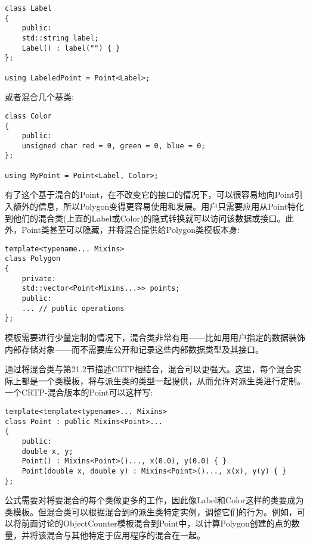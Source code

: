 \begin{lstlisting}[style=styleCXX]
class Label
{
	public:
	std::string label;
	Label() : label("") { }
};

using LabeledPoint = Point<Label>;
\end{lstlisting}

或者混合几个基类:

\begin{lstlisting}[style=styleCXX]
class Color
{
	public:
	unsigned char red = 0, green = 0, blue = 0;
};

using MyPoint = Point<Label, Color>;
\end{lstlisting}

有了这个基于混合的Point，在不改变它的接口的情况下，可以很容易地向Point引入额外的信息，所以Polygon变得更容易使用和发展。用户只需要应用从Point特化到他们的混合类(上面的Label或Color)的隐式转换就可以访问该数据或接口。此外，Point类甚至可以隐藏，并将混合提供给Polygon类模板本身:

\begin{lstlisting}[style=styleCXX]
template<typename... Mixins>
class Polygon
{
	private:
	std::vector<Point<Mixins...>> points;
	public:
	... // public operations
};
\end{lstlisting}

模板需要进行少量定制的情况下，混合类非常有用——比如用用户指定的数据装饰内部存储对象——而不需要库公开和记录这些内部数据类型及其接口。


通过将混合类与第21.2节描述CRTP相结合，混合可以更强大。这里，每个混合实际上都是一个类模板，将与派生类的类型一起提供，从而允许对派生类进行定制。一个CRTP-混合版本的Point可以这样写:

\begin{lstlisting}[style=styleCXX]
template<template<typename>... Mixins>
class Point : public Mixins<Point>...
{
	public:
	double x, y;
	Point() : Mixins<Point>()..., x(0.0), y(0.0) { }
	Point(double x, double y) : Mixins<Point>()..., x(x), y(y) { }
};
\end{lstlisting}

公式需要对将要混合的每个类做更多的工作，因此像Label和Color这样的类要成为类模板。但混合类可以根据混合到的派生类特定实例，调整它们的行为。例如，可以将前面讨论的ObjectCounter模板混合到Point中，以计算Polygon创建的点的数量，并将该混合与其他特定于应用程序的混合在一起。


